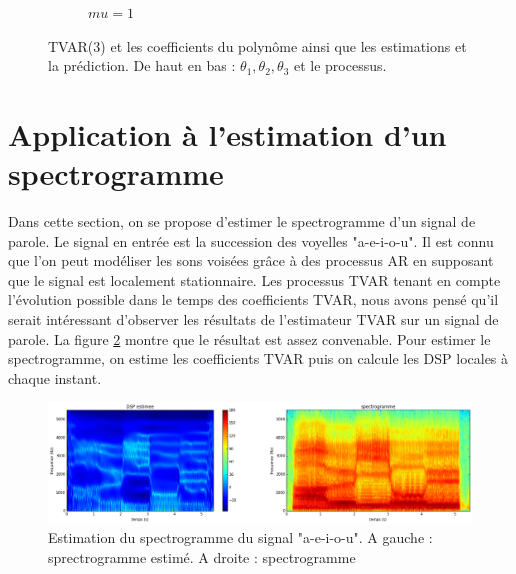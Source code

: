 \documentclass{report}
\begin{document}
\begin{figure}[h]
\begin{subfigure}{\textwidth}
\caption{$mu = 1$}
\end{subfigure}
\caption{TVAR(3) et les coefficients du polynôme ainsi que les estimations et la prédiction. De haut en bas : $\theta_1, \theta_2, \theta_3$ et le processus.}
\label{fig:TVARd_estim}
\end{figure}

\section{Application à l'estimation d'un spectrogramme}
Dans cette section, on se propose d'estimer le spectrogramme d'un signal de parole. Le signal en entrée est la succession des voyelles "a-e-i-o-u". Il est connu que l'on peut modéliser les sons voisées grâce à des processus AR en supposant que le signal est localement stationnaire. Les processus TVAR tenant en compte l'évolution possible dans le temps des coefficients TVAR, nous avons pensé qu'il serait intéressant d'observer les résultats de l'estimateur TVAR sur un signal de parole. La figure \ref{fig:parole} montre que le résultat est assez convenable. Pour estimer le spectrogramme, on estime les coefficients TVAR puis on calcule les DSP locales à chaque instant.

\begin{figure}[h!]
\includegraphics[scale=0.45]{presentation/images/parole.png}
\caption{Estimation du spectrogramme du signal "a-e-i-o-u". A gauche : sprectrogramme estimé. A droite : spectrogramme}
\label{fig:parole}
\end{figure}

\pagebreak
{}
{}


\end{document}
